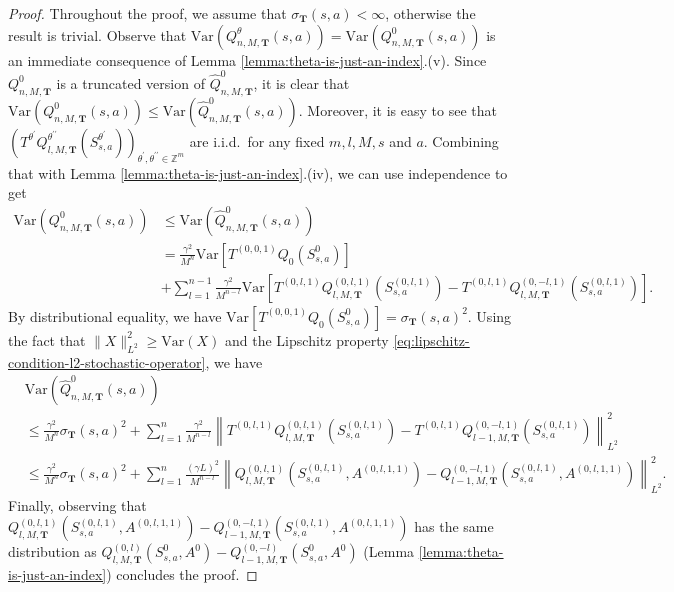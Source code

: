 \documentclass[11pt]{article}
\numberwithin{equation}{section}
\theoremstyle{definition}
\theoremstyle{remark}
\def\Z{{\mathbb{Z}}}
\begin{document}
\begin{proof}
    Throughout the proof, we assume that $\sigma_{\mathbf T}(s,a) < \infty$, otherwise the result is trivial. Observe that $\mathrm{Var} (Q _{n,M,\mathbf T} ^{\theta}(s,a)) = \mathrm{Var}(Q _{n,M,\mathbf T} ^{0}(s,a))$ is an immediate consequence of Lemma \ref{lemma:theta-is-just-an-index}.(v). Since $Q^0_{n,M,\mathbf T}$ is a truncated version of $\hat{Q}^0_{n,M,\mathbf T}$, it is clear that $\mathrm{Var}(Q _{n,M,\mathbf T} ^{0}(s,a)) \leq \mathrm{Var}(\hat{Q} _{n,M,\mathbf T} ^{0}(s,a))$. Moreover, it is easy to see that $\left(T^{\theta^\prime}Q^{\theta^{\prime\prime}}_{l,M,\mathbf T}\left(S_{s,a}^{\theta^\prime}\right)\right)_{\theta^\prime, \theta^{\prime \prime} \in \Z^m}$ are i.i.d.~for any fixed $m,l,M,s$ and $a$. Combining that with Lemma \ref{lemma:theta-is-just-an-index}.(iv), we can use independence to get
    \begin{align*}
        \mathrm{Var} \left(Q^0_{n,M,\mathbf T}(s,a) \right) & \leq  \mathrm{Var}\left(\hat{Q}^0_{n,M,\mathbf T}(s,a)\right) \\
            & = \frac{\gamma^2}{M ^{n}} \mathrm{Var}\left[T^{(0,0,1)}Q_0 \left(S^0_{s,a} \right)\right] \\
            & + \sum_{l = 1}^{n-1} \frac{\gamma^2}{M ^{n - l}} \mathrm{Var} \left[ T^{(0,l,1)}Q _{l,M,\mathbf T}^{(0,l,1)} \left(S_{s,a}^{(0,l,1)} \right)   - T^{(0,l,1)}Q _{l,M,\mathbf T}^{(0,-l,1)}\left(S_{s,a}^{(0,l,1)} \right) \right].
    \end{align*}
    By distributional equality, we have $\mathrm{Var}[T^{(0,0,1)}Q_0(S^0_{s,a})] = \sigma_{\mathbf T}(s,a)^2$. Using the fact that $\| X \|^2_{L^2} \geq \mathrm{Var}(X)$ and the Lipschitz property \eqref{eq:lipschitz-condition-l2-stochastic-operator}, we have 
    \begin{equation*}
        \begin{aligned}
            &\mathrm{Var} \left(\hat{Q} _{n,M,\mathbf T} ^{0}(s,a)\right) \\
            & \leq \frac{\gamma^2}{M ^{n}} \sigma _{\mathbf T}(s,a) ^{2}     + \sum_{l = 1}^{n} \frac{\gamma^2}{M ^{n - l}} \left\| T^{(0,l,1)} Q_{l,M,\mathbf T} ^{(0,l,1)}\left(S^{(0,l,1)}_{s,a}\right) - T^{(0,l,1)} Q_{l-1,M,\mathbf T} ^{(0,-l,1)} \left(S^{(0,l,1)}_{s,a}\right) \right\|_{L^2}^2\\
            & \leq \frac{\gamma^2}{M^n}\sigma_{\mathbf T}(s,a)^2  + \sum_{l = 1}^n \frac{(\gamma L)^2}{M^{n-l}} \left\| Q_{l,M,\mathbf T} ^{(0,l,1)}\left(S_{s,a}^{(0,l,1)},A^{(0,l,1,1)}\right) - Q_{l-1,M,\mathbf T} ^{(0,-l,1)}\left(S_{s,a}^{(0,l,1)},A^{(0,l,1,1)}\right) \right\|^2_{L^2} .
        \end{aligned}
    \end{equation*}
    Finally, observing that $Q_{l,M,\mathbf T} ^{(0,l,1)}(S_{s,a}^{(0,l,1)},A^{(0,l,1,1)}) - Q_{l-1,M,\mathbf T} ^{(0,-l,1)}(S_{s,a}^{(0,l,1)},A^{(0,l,1,1)})$ has the same distribution as $Q_{l,M,\mathbf T} ^{(0,l)}(S_{s,a}^{0},A^{0}) - Q_{l-1,M,\mathbf T} ^{(0,-l)}(S_{s,a}^0,A^{0})$ (Lemma \ref{lemma:theta-is-just-an-index}) concludes the proof.
\end{proof}
\end{document}
